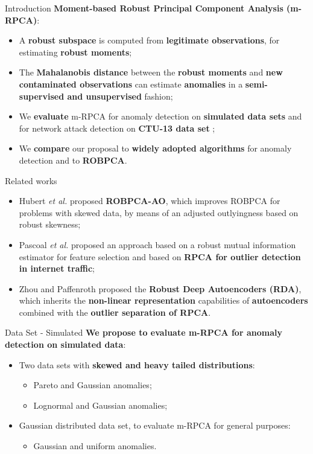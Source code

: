 \documentclass[newPxFont, numfooter, sectionpages]{beamer}
\begin{document}
\begin{frame}{Introduction}
    \textbf{Moment-based Robust Principal Component Analysis (m-RPCA)}:
	\begin{itemize}
		\item A \textbf{robust subspace} is computed from \textbf{legitimate observations}, for estimating \textbf{robust moments};
		\item The \textbf{Mahalanobis distance} between the \textbf{robust moments} and \textbf{new contaminated observations} can estimate \textbf{anomalies} in a \textbf{semi-supervised and unsupervised} fashion;
		\item We \textbf{evaluate} m-RPCA for anomaly detection on \textbf{simulated data sets} and for network attack detection on \textbf{CTU-13 data set} \cite{garcia2014empirical};
		\item We \textbf{compare} our proposal to \textbf{widely adopted algorithms} for anomaly detection and to \textbf{ROBPCA}.
	\end{itemize}
\end{frame}

\begin{frame}[c]{Related works}
	\begin{itemize}
	    \item Hubert \emph{et al.} \cite{hubert2009robustskewed} proposed \textbf{ROBPCA-AO}, which improves ROBPCA for problems with skewed data, by means of an adjusted outlyingness based on robust skewness;
		\item Pascoal \emph{et al.} \cite{pascoal2012robust} proposed an approach based on a robust mutual information estimator for feature selection and based on \textbf{RPCA for outlier detection in internet traffic};
		\item Zhou and Paffenroth \cite{zhou2017anomaly} proposed the \textbf{Robust Deep Autoencoders (RDA)}, which inherits the \textbf{non-linear representation} capabilities of \textbf{autoencoders} combined with the \textbf{outlier separation of RPCA}. 
	\end{itemize}
\end{frame}

\begin{frame}[c]{Data Set - Simulated}
    \textbf{We propose to evaluate m-RPCA for anomaly detection on simulated data}:
	\begin{itemize}
		\item Two data sets with \textbf{skewed and heavy tailed distributions}:
		\begin{itemize}
    		\item Pareto and Gaussian anomalies;
    		\item Lognormal and Gaussian anomalies;
		\end{itemize}
		\item Gaussian distributed data set, to evaluate m-RPCA for general purposes:
    		\begin{itemize}
        		\item Gaussian and uniform anomalies.
    		\end{itemize}
	\end{itemize}
\end{frame}
\end{document}
